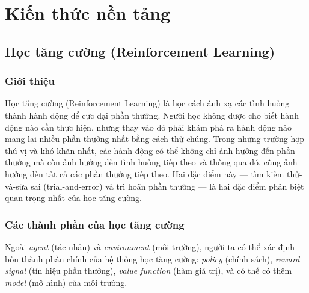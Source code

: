 \chapter{Kiến thức nền tảng}

\section{Học tăng cường (Reinforcement Learning)}
\subsection{Giới thiệu}
Học tăng cường (Reinforcement Learning) \cite{reinforcementlearninganintroduction} là học cách ánh xạ các tình huống thành hành động để cực đại phần thưởng. Người học không được cho biết hành động nào cần thực hiện, nhưng thay vào đó phải khám phá ra hành động nào mang lại nhiều phần thưởng nhất bằng cách thử chúng. Trong những trường hợp thú vị và khó khăn nhất, các hành động có thể không chỉ ảnh hưởng đến phần thưởng mà còn ảnh hưởng đến tình huống tiếp theo và thông qua đó, cũng ảnh hưởng đến tất cả các phần thưởng tiếp theo. Hai đặc điểm này — tìm kiếm thử-và-sửa sai (trial-and-error) và trì hoãn phần thưởng — là hai đặc điểm phân biệt quan trọng nhất của học tăng cường.

\subsection{Các thành phần của học tăng cường}
Ngoài \textit{agent} (tác nhân) và \textit{environment} (môi trường), người ta có thể xác định bốn thành phần chính của hệ thống học tăng cường: \textit{policy} (chính sách), \textit{reward signal} (tín hiệu phần thưởng), \textit{value function} (hàm giá trị), và có thể có thêm \textit{model} (mô hình) của môi trường.

